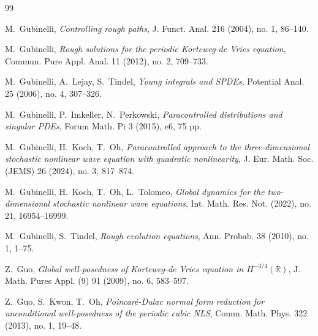 \documentclass[letterpaper, 11pt,  reqno]{amsart}
\newcommand{\1}{\hspace{0.5mm}\text{I}\hspace{0.5mm}}
\newcommand{\R}{\mathbb{R}}
\numberwithin{equation}{section}
\numberwithin{theorem}{section}
\begin{document}
\begin{thebibliography}{99}


M.~Gubinelli,
{\it Controlling rough paths},
J. Funct. Anal. 216 (2004), no. 1, 86--140.



M.~Gubinelli, 
{\it Rough solutions for the periodic Korteweg-de Vries equation},
Commun. Pure Appl. Anal. 11 (2012), no. 2, 709--733.


M.~Gubinelli, A.~Lejay, S.~Tindel,
{\it Young integrals and SPDEs},
Potential Anal. 25 (2006), no. 4, 307--326.



M.~Gubinelli, P.~Imkeller, N.~Perkowski,
{\it Paracontrolled distributions and singular PDEs},
Forum Math. Pi 3 (2015), e6, 75 pp.

%
%
%

M.~Gubinelli, H.~Koch, T.~Oh, 
{\it  Paracontrolled approach to the three-dimensional stochastic nonlinear wave equation with quadratic nonlinearity},  
J. Eur. Math. Soc. (JEMS) 26 (2024), no. 3, 817--874. 

%
%
%

M.~Gubinelli, H.~Koch, T.~Oh, L.~Tolomeo,
{\it  Global dynamics for the two-dimensional stochastic nonlinear wave equations},
 Int. Math. Res. Not. (2022), no. 21, 16954--16999. 


%


M.~Gubinelli, S.~Tindel,
{\it Rough evolution equations},
Ann. Probab. 38 (2010), no. 1, 1--75.



Z.~Guo,
{\it  Global well-posedness of Korteweg-de Vries equation in $H^{-3/4}(\R)$}, 
J. Math. Pures Appl. (9) 91 (2009), no. 6, 583--597.


Z.~Guo, S.~Kwon, T.~Oh, 
{\it Poincar\'e-Dulac normal form reduction for unconditional well-posedness of
the periodic cubic NLS}, Comm. Math. Phys. 322 (2013), no. 1, 19--48.






\end{thebibliography}
\end{document}
